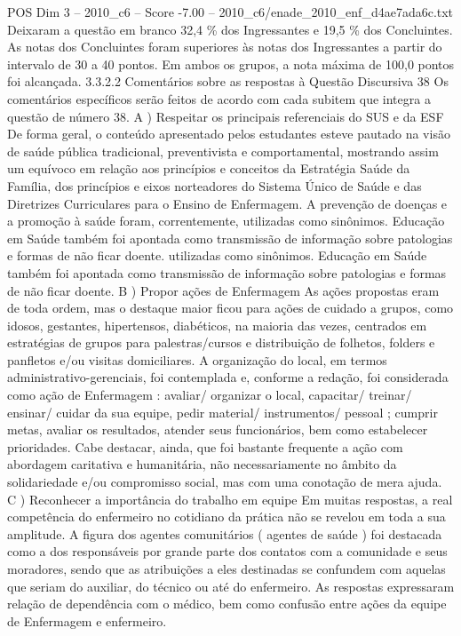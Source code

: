 \begin{textsample}{POS Dim 3 – 2010\_c6 – Score -7.00 – 2010\_c6/enade\_2010\_enf\_d4ae7ada6c.txt}
Deixaram a questão em branco 32,4 \% dos Ingressantes e 19,5 \% dos Concluintes.
As notas dos Concluintes foram superiores às notas dos Ingressantes a partir do intervalo de 30 a 40 pontos.
Em ambos os grupos, a nota máxima de 100,0 pontos foi alcançada. 3.3.2.2 Comentários sobre as respostas à Questão Discursiva 38 Os comentários específicos serão feitos de acordo com cada subitem que integra a questão de número 38.
A ) Respeitar os principais referenciais do SUS e da ESF De forma geral, o conteúdo apresentado pelos estudantes esteve pautado na visão de saúde pública tradicional, preventivista e comportamental, mostrando assim um equívoco em relação aos princípios e conceitos da Estratégia Saúde da Família, dos princípios e eixos norteadores do Sistema Único de Saúde e das Diretrizes Curriculares para o Ensino de Enfermagem.
A prevenção de doenças e a promoção à saúde foram, correntemente, utilizadas como sinônimos.
Educação em Saúde também foi apontada como transmissão de informação sobre patologias e formas de não ficar doente. utilizadas como sinônimos.
Educação em Saúde também foi apontada como transmissão de informação sobre patologias e formas de não ficar doente.
B ) Propor ações de Enfermagem As ações propostas eram de toda ordem, mas o destaque maior ficou para ações de cuidado a grupos, como idosos, gestantes, hipertensos, diabéticos, na maioria das vezes, centrados em estratégias de grupos para palestras/cursos e distribuição de folhetos, folders e panfletos e/ou visitas domiciliares.
A organização do local, em termos administrativo-gerenciais, foi contemplada e, conforme a redação, foi considerada como ação de Enfermagem : avaliar/ organizar o local, capacitar/ treinar/ ensinar/ cuidar da sua equipe, pedir material/ instrumentos/ pessoal ; cumprir metas, avaliar os resultados, atender seus funcionários, bem como estabelecer prioridades.
Cabe destacar, ainda, que foi bastante frequente a ação com abordagem caritativa e humanitária, não necessariamente no âmbito da solidariedade e/ou compromisso social, mas com uma conotação de mera ajuda.
C ) Reconhecer a importância do trabalho em equipe Em muitas respostas, a real competência do enfermeiro no cotidiano da prática não se revelou em toda a sua amplitude.
A figura dos agentes comunitários ( agentes de saúde ) foi destacada como a dos responsáveis por grande parte dos contatos com a comunidade e seus moradores, sendo que as atribuições a eles destinadas se confundem com aquelas que seriam do auxiliar, do técnico ou até do enfermeiro.
As respostas expressaram relação de dependência com o médico, bem como confusão entre ações da equipe de Enfermagem e enfermeiro.

\end{textsample}
